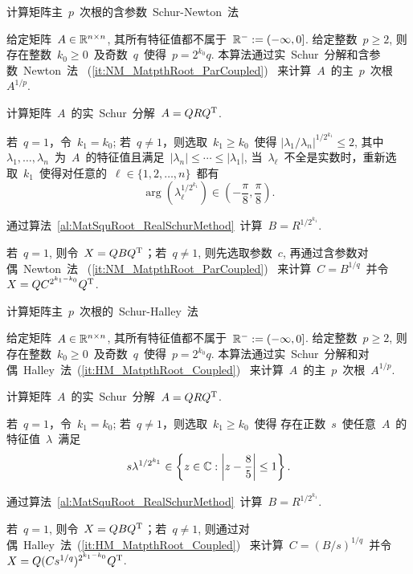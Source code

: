 \begin{lemma}
\begin{algorithm}[h!]
\caption{计算矩阵主~$p$~次根的含参数~Schur-Newton~法~\cite[算法~
3.3]{GuoHigham2006}} \label{al:MatpthRoot_ParSchurNewton_GuoHig06}
给定矩阵~$A\in\mathbb{R}^{n\times n}$, 其所有特征值都不属于~$\mathbb{R}^- :=
(-\infty,0]$. 给定整数~$p\geq 2$, 则存在整数~$k_0 \geq
0$~及奇数~$q$~使得~$p = 2^{k_0}q$.
本算法通过实~Schur~分解和含参数~Newton~法~
(\ref{it:NM_MatpthRoot_ParCoupled})~
来计算~$A$~的主~$p$~次根~$A^{1/p}$.
\begin{list}{.}{
\setlength{\rightmargin}{0em}\setlength{\leftmargin}{1.2em}}
\item
计算矩阵~$A$~的实~Schur~分解~$A = QR{Q}^\mathrm{T}$.
\item
若~$q=1$，令~$k_1 = k_0$; 若~$q\neq1$，则选取~$k_1\geq k_0$~使得
$|\lambda_1/\lambda_n|^{1/2^{k_1}}\leq 2$, 其中~$\lambda_1,\ldots,
\lambda_n$~为~$A$~的特征值且满足~$|\lambda_n|\leq \cdots \leq
|\lambda_1|$,
当~$\lambda_\ell$~不全是实数时，重新选取~$k_1$~使得对任意的~$\ell
\in \{1,2,\ldots,n\}$~都有
$$
\arg(\lambda_\ell^{1/2^{k_1}}) \in
\left(-\frac{\pi}{8},\frac{\pi}{8}\right).
$$
\item
通过算法~\ref{al:MatSquRoot_RealSchurMethod}~计算~$B =
R^{1/{2^{k_1}}}$.
\item
若~$q=1$, 则令~$X = QB{Q}^\mathrm{T}$；若~$q\neq 1$, 则先选取参数~$c$,
再通过含参数对偶~Newton~法~ (\ref{it:NM_MatpthRoot_ParCoupled})~
来计算~$C = B^{1/q}$~并令~$X = QC^{2^{k_1-k_0}}{Q}^\mathrm{T}$.
\end{list}
\end{algorithm}


\begin{algorithm}[h!]
\caption{计算矩阵主~$p$~次根的~Schur-Halley~法~\cite[算法~
4]{Iannazzo2008}} \label{al:MatpthRoot_SchurHalley_Ian08}
给定矩阵~$A\in\mathbb{R}^{n\times n}$, 其所有特征值都不属于~$\mathbb{R}^- :=
(-\infty,0]$. 给定整数~$p\geq 2$, 则存在整数~$k_0 \geq
0$~及奇数~$q$~使得~$p = 2^{k_0}q$.
本算法通过实~Schur~分解和对偶~Halley~法~(\ref{it:HM_MatpthRoot_Coupled})~
来计算~$A$~的主~$p$~次根~$A^{1/p}$.
\begin{list}{.}{
\setlength{\rightmargin}{0em}\setlength{\leftmargin}{1.2em}}
\item
计算矩阵~$A$~的实~Schur~分解~$A = QR{Q}^\mathrm{T}$.
\item
若~$q=1$，令~$k_1 = k_0$; 若~$q\neq1$，则选取~$k_1\geq k_0$~使得
存在正数~$s$~使任意~$A$~的特征值~$\lambda$~满足
$$
s \lambda^{1/{2^{k_1}}} \in \left\{z\in \mathbb{C}: \left|z -
\frac{8}{5}\right| \leq 1\right\}.
$$
\item
通过算法~\ref{al:MatSquRoot_RealSchurMethod}~计算~$B =
R^{1/{2^{k_1}}}$.
\item
若~$q=1$, 则令~$X = QB{Q}^\mathrm{T}$；若~$q\neq 1$,
则通过对偶~Halley~法~(\ref{it:HM_MatpthRoot_Coupled})~ 来计算~$C =
(B/s)^{1/q}$~并令~$X = Q(Cs^{1/q})^{2^{k_1-k_0}}{Q}^\mathrm{T}$.
\end{list}
\end{algorithm}











\end{lemma}
